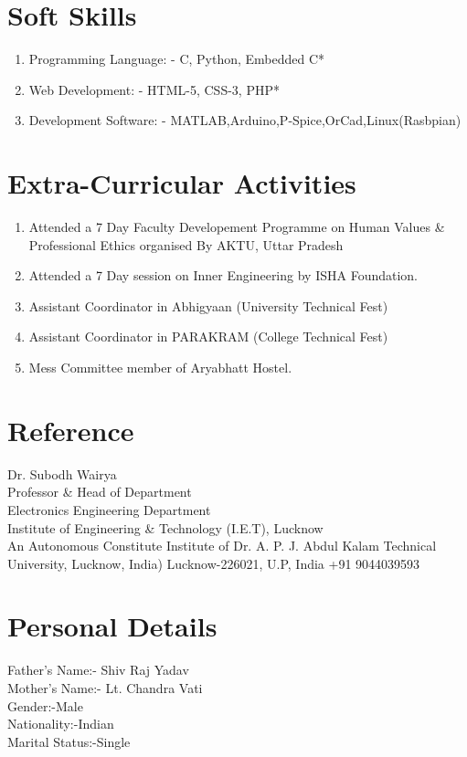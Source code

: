\documentclass[12pt]{article}
\begin{document}
\section*{Soft Skills}
\begin{enumerate}

  \item Programming Language: - C, Python, Embedded C*
  \item Web Development: - HTML-5, CSS-3, PHP*
  \item Development Software: - MATLAB,Arduino,P-Spice,OrCad,Linux(Rasbpian)
  \end{enumerate}
  
\section*{Extra-Curricular Activities}
\begin{enumerate}
\item Attended a 7 Day Faculty Developement Programme on Human Values \& Professional Ethics organised By
AKTU, Uttar Pradesh
\item Attended a 7 Day session on Inner Engineering by ISHA Foundation.
\item Assistant Coordinator in Abhigyaan (University Technical Fest)
\item Assistant Coordinator in PARAKRAM (College Technical Fest)
\item Mess Committee member of Aryabhatt Hostel.
\end{enumerate}

\section*{\large {Reference}}
Dr. Subodh Wairya\\
Professor \& Head of Department\\
Electronics Engineering Department\\
Institute of Engineering \& Technology (I.E.T), Lucknow\\
An Autonomous Constitute Institute of Dr. A. P. J. Abdul Kalam Technical University, Lucknow, India)
Lucknow-226021, U.P, India
+91 9044039593


\section*{Personal Details}
{\large {Father's Name:- \hspace{1.1cm} Shiv Raj Yadav\\
Mother's Name:- \hspace{1cm} Lt. Chandra Vati\\
Gender:-\hspace{2.9cm}Male\\
Nationality:-\hspace{2.0cm}Indian\\
Marital Status:-\hspace{1.4cm}Single\\
}}
\end{document}
